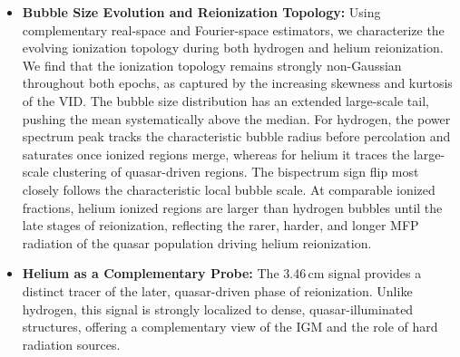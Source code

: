 \documentclass[apj,twocolumn, appendixfloats, twocolappendix, numberedappendix, tighten]{openjournal}
\DeclareRobustCommand{\lumina}{\mbox{\textsc{lumina}}\xspace}
\begin{document}
\begin{itemize}
\item \textbf{Bubble Size Evolution and Reionization Topology:} Using complementary real-space and Fourier-space estimators, we characterize the evolving ionization topology during both hydrogen and helium reionization. We find that the ionization topology remains strongly non-Gaussian throughout both epochs, as captured by the increasing skewness and kurtosis of the VID. The bubble size distribution has an extended large-scale tail, pushing the mean systematically above the median. For hydrogen, the power spectrum peak tracks the characteristic bubble radius before percolation and saturates once ionized regions merge, whereas for helium it traces the large-scale clustering of quasar-driven  regions. The bispectrum sign flip most closely follows the characteristic local bubble scale. At comparable ionized fractions, helium ionized regions are larger than hydrogen bubbles until the late stages of reionization, reflecting the rarer, harder, and longer MFP radiation of the quasar population driving helium reionization.

\item \textbf{Helium as a Complementary Probe:} The 3.46\,cm signal provides a distinct tracer of the later, quasar-driven phase of reionization. Unlike hydrogen, this signal is strongly localized to dense, quasar-illuminated structures, offering a complementary view of the IGM and the role of hard radiation sources.
\end{itemize}




\end{document}
